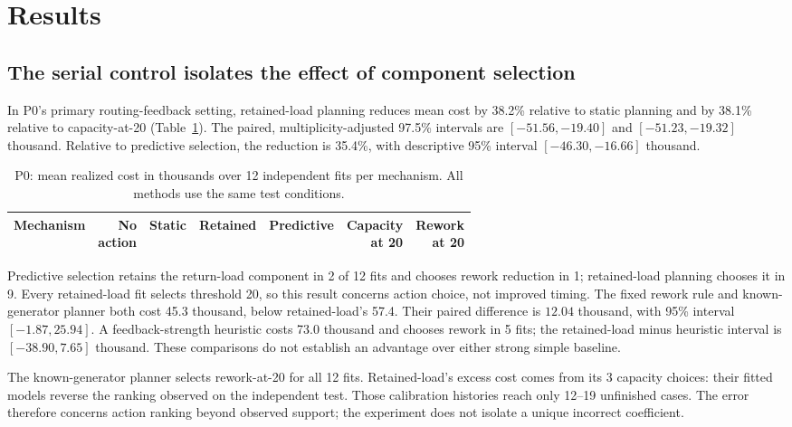 \section{Results}
\subsection{The serial control isolates the effect of component selection}
In P0's primary routing-feedback setting, retained-load planning reduces mean cost by 38.2\% relative to static planning and by 38.1\% relative to capacity-at-20 (Table~\ref{tab:primary}). The paired, multiplicity-adjusted 97.5\% intervals are $[-51.56,-19.40]$ and $[-51.23,-19.32]$ thousand. Relative to predictive selection, the reduction is 35.4\%, with descriptive 95\% interval $[-46.30,-16.66]$ thousand.

\begin{table}[t]\caption{P0: mean realized cost in thousands over 12 independent fits per mechanism. All methods use the same test conditions.}\label{tab:primary}\centering\small\setlength{\tabcolsep}{3pt}
\begin{tabular}{lrrrrrr}\toprule
Mechanism & \shortstack{No\\action} & Static & Retained & Predictive & \shortstack{Capacity\\at 20} & \shortstack{Rework\\at 20}\\\midrule

\end{tabular}\end{table}

Predictive selection retains the return-load component in 2 of 12 fits and chooses rework reduction in 1; retained-load planning chooses it in 9. Every retained-load fit selects threshold 20, so this result concerns action choice, not improved timing. The fixed rework rule and known-generator planner both cost 45.3 thousand, below retained-load's 57.4. Their paired difference is $12.04$ thousand, with 95\% interval $[-1.87,25.94]$. A feedback-strength heuristic costs 73.0 thousand and chooses rework in 5 fits; the retained-load minus heuristic interval is $[-38.90,7.65]$ thousand. These comparisons do not establish an advantage over either strong simple baseline.

The known-generator planner selects rework-at-20 for all 12 fits. Retained-load's excess cost comes from its 3 capacity choices: their fitted models reverse the ranking observed on the independent test. Those calibration histories reach only 12--19 unfinished cases. The error therefore concerns action ranking beyond observed support; the experiment does not isolate a unique incorrect coefficient.

